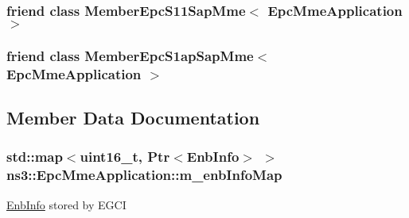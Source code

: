 \subsubsection[{\texorpdfstring{Member\+Epc\+S11\+Sap\+Mme$<$ Epc\+Mme\+Application $>$}{MemberEpcS11SapMme< EpcMmeApplication >}}]{\setlength{\rightskip}{0pt plus 5cm}friend class {\bf Member\+Epc\+S11\+Sap\+Mme}$<$ {\bf Epc\+Mme\+Application} $>$\hspace{0.3cm}{\ttfamily [friend]}}\hypertarget{classns3_1_1EpcMmeApplication_a638765700ca06374869b71af353fbe71}{}\label{classns3_1_1EpcMmeApplication_a638765700ca06374869b71af353fbe71}
\subsubsection[{\texorpdfstring{Member\+Epc\+S1ap\+Sap\+Mme$<$ Epc\+Mme\+Application $>$}{MemberEpcS1apSapMme< EpcMmeApplication >}}]{\setlength{\rightskip}{0pt plus 5cm}friend class {\bf Member\+Epc\+S1ap\+Sap\+Mme}$<$ {\bf Epc\+Mme\+Application} $>$\hspace{0.3cm}{\ttfamily [friend]}}\hypertarget{classns3_1_1EpcMmeApplication_a22269751c319acf6b5548bb04400ba6a}{}\label{classns3_1_1EpcMmeApplication_a22269751c319acf6b5548bb04400ba6a}


\subsection{Member Data Documentation}
\subsubsection[{\texorpdfstring{m\+\_\+enb\+Info\+Map}{m_enbInfoMap}}]{\setlength{\rightskip}{0pt plus 5cm}std\+::map$<$uint16\+\_\+t, {\bf Ptr}$<${\bf Enb\+Info}$>$ $>$ ns3\+::\+Epc\+Mme\+Application\+::m\+\_\+enb\+Info\+Map\hspace{0.3cm}{\ttfamily [private]}}\hypertarget{classns3_1_1EpcMmeApplication_a6c49c825306fc4923aef0352a1fab029}{}\label{classns3_1_1EpcMmeApplication_a6c49c825306fc4923aef0352a1fab029}
\hyperlink{structns3_1_1EpcMmeApplication_1_1EnbInfo}{Enb\+Info} stored by E\+G\+CI 
